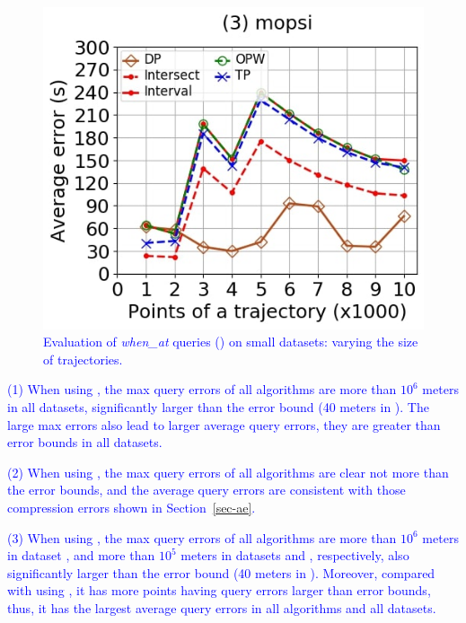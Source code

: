 {\begin{figure}[tb!]
	\includegraphics[scale=0.250]{Figures/Exp-when-DAD-error-size-mopsi.jpg}	
	\vspace{-2ex}
	\caption{\small \textcolor{blue}{Evaluation of \emph{when\_at} queries (\dad) on small datasets: varying the size of trajectories.}}
	\label{fig:query-when-dad-size}
	\vspace{-1ex}
\end{figure}



\ni \textcolor{blue}{(1) When using \ped, the max query errors of all algorithms are more than $10^6$ meters in all datasets, significantly larger than the error bound (40 meters in ). The large max errors also lead to larger average query errors, \ie they are greater than error bounds in all datasets.}


\ni \textcolor{blue}{(2) When using \sed, the max query errors of all algorithms are clear not more than the error bounds, and the average query errors are consistent with those compression errors shown in Section~\ref{sec-ae}.}


\ni \textcolor{blue}{(3) When using \dad, the max query errors of all algorithms are more than $10^6$ meters in dataset \ucar, and more than $10^5$ meters in datasets \geolife and \mopsi, respectively, also significantly larger than the error bound (40 meters in ). Moreover, compared with using \ped, it has more points having query errors larger than error bounds, thus, it has the largest average query errors in all algorithms and all datasets.}

}
